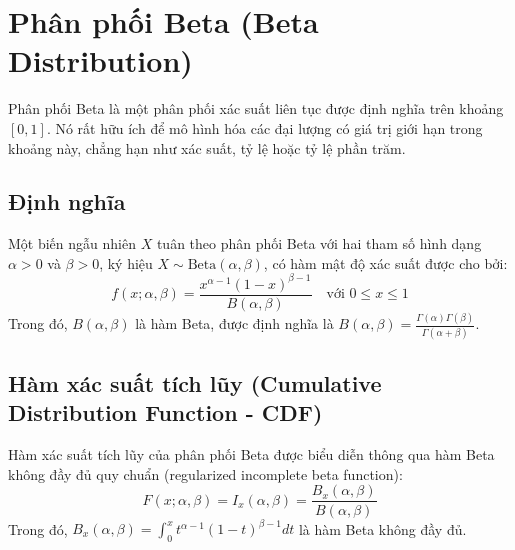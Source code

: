 \section{Phân phối Beta (Beta Distribution)}
	Phân phối Beta là một phân phối xác suất liên tục được định nghĩa trên khoảng $[0, 1]$. Nó rất hữu ích để mô hình hóa các đại lượng có giá trị giới hạn trong khoảng này, chẳng hạn như xác suất, tỷ lệ hoặc tỷ lệ phần trăm.
	
	
	\subsection{Định nghĩa}
		Một biến ngẫu nhiên $X$ tuân theo phân phối Beta với hai tham số hình dạng $\alpha > 0$ và $\beta > 0$, ký hiệu $X \sim \text{Beta}(\alpha, \beta)$, có hàm mật độ xác suất được cho bởi:
		\[ f(x; \alpha, \beta) = \frac{x^{\alpha-1}(1-x)^{\beta-1}}{B(\alpha, \beta)} \quad \text{với } 0 \le x \le 1 \]
		Trong đó, $B(\alpha, \beta)$ là hàm Beta, được định nghĩa là $B(\alpha, \beta) = \frac{\Gamma(\alpha)\Gamma(\beta)}{\Gamma(\alpha+\beta)}$.
	
	\subsection{Hàm xác suất tích lũy (Cumulative Distribution Function - CDF)}
	Hàm xác suất tích lũy của phân phối Beta được biểu diễn thông qua hàm Beta không đầy đủ quy chuẩn (regularized incomplete beta function):
	\[ F(x; \alpha, \beta) = I_x(\alpha, \beta) = \frac{B_x(\alpha, \beta)}{B(\alpha, \beta)} \]
	Trong đó, $B_x(\alpha, \beta) = \int_0^x t^{\alpha-1}(1-t)^{\beta-1} dt$ là hàm Beta không đầy đủ.
	
